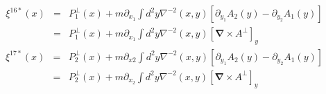 \documentclass[a4paper,thmsa,12pt]{report}
\begin{document}
\begin{eqnarray}
\xi ^{16\ast }\left( x\right) &=&P_{1}^{\perp }\left( x\right) +m\partial
_{x_{1}}\int d^{2}y\nabla ^{-2}\left( x,y\right) \left[ \partial
_{y_{1}}A_{2}\left( y\right) -\partial _{y_{2}}A_{1}\left( y\right) \right] 
\nonumber \\
&=&P_{1}^{\perp }\left( x\right) +m\partial _{x_{1}}\int d^{2}y\nabla
^{-2}\left( x,y\right) \left[ \mathbf{\nabla \times }A^{\perp }\right] _{y}
\label{360.i}
\end{eqnarray}
\begin{eqnarray}
\xi ^{17\ast }\left( x\right) &=&P_{2}^{\perp }\left( x\right) +m\partial
_{x2}\int d^{2}y\nabla ^{-2}\left( x,y\right) \left[ \partial
_{y_{1}}A_{2}\left( y\right) -\partial _{y_{2}}A_{1}\left( y\right) \right] 
\nonumber \\
&=&P_{2}^{\perp }\left( x\right) +m\partial _{x_{2}}\int d^{2}y\nabla
^{-2}\left( x,y\right) \left[ \mathbf{\nabla \times }A^{\perp }\right] _{y}
\label{360.j}
\end{eqnarray}
\end{document}
